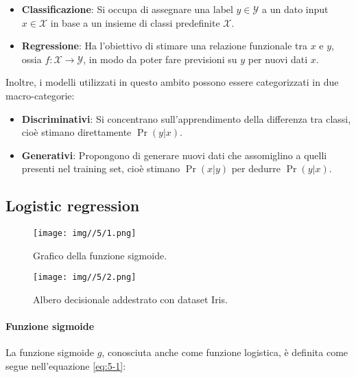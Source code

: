 \begin{itemize}
    \item \textbf{Classificazione}: Si occupa di assegnare una label \( y \in \mathcal{Y} \) a un dato input \( x \in \mathcal{X} \) in base a un insieme di classi predefinite \( \mathcal{X} \).
    \item \textbf{Regressione}: Ha l'obiettivo di stimare una relazione funzionale tra \( x \) e \( y \), ossia \( f: \mathcal{X} \to \mathcal{Y} \), in modo da poter fare previsioni su \( y \) per nuovi dati \( x \).
\end{itemize}

Inoltre, i modelli utilizzati in questo ambito possono essere categorizzati in due macro-categorie:

\begin{itemize}
    \item \textbf{Discriminativi}: Si concentrano sull'apprendimento della differenza tra classi, cioè stimano direttamente \( \Pr(y|x) \).
    \item \textbf{Generativi}: Propongono di generare nuovi dati che assomiglino a quelli presenti nel training set, cioè stimano \( \Pr(x|y) \) per dedurre \( \Pr(y|x) \).
\end{itemize}

\subsection{Logistic regression}

\begin{figure}[t]
    \begin{multicols}{2}
        \centering
        \texttt{[image: img//5/1.png]}
        \caption{Grafico della funzione sigmoide.}
        \label{fig:5-1}
        
        \columnbreak
        
        \texttt{[image: img//5/2.png]}
        \caption{Albero decisionale addestrato con dataset Iris.}
        \label{fig:5-2}
    \end{multicols}
\end{figure}

\paragraph{Funzione sigmoide}

La funzione sigmoide \( g \), conosciuta anche come funzione logistica, è definita come segue nell'equazione \ref{eq:5-1}:

